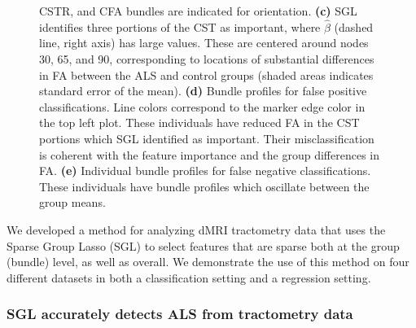 \documentclass[10pt,%
               aps,%
               prl,%
               reprint,%
               superscriptaddress,%
               preprintnumbers,%
               linenumbers,%
               amsmath,%
               floatfix]{revtex4-1}
\begin{document}
\begin{figure}
{        CSTR, and CFA bundles are indicated for orientation.
        {\bf (c)} SGL identifies three portions of the CST as important,
        where $\hat{\beta}$ (dashed line, right axis) has large values. These
        are centered around nodes 30, 65, and 90, corresponding to locations
        of substantial differences in FA between the ALS and control groups
        (shaded areas indicates standard error of the mean).
        {\bf (d)} Bundle profiles for false positive classifications. Line
        colors correspond to the marker edge color in the top left plot.
        These individuals have reduced FA in the CST portions which SGL
        identified as important. Their misclassification is coherent with the
        feature importance and the group differences in FA.
        {\bf (e)} Individual bundle profiles for false negative
        classifications. These individuals have bundle profiles which
        oscillate between the group means.
    }
\end{figure}

We developed a method for analyzing dMRI tractometry data that uses the Sparse
Group Lasso (SGL) to select features that are sparse both at the group (bundle) level, as well as overall.
We demonstrate the use of this method on four different datasets in
both a classification setting and a regression setting.

\subsubsection*{SGL accurately detects ALS from tractometry data}
\end{document}
